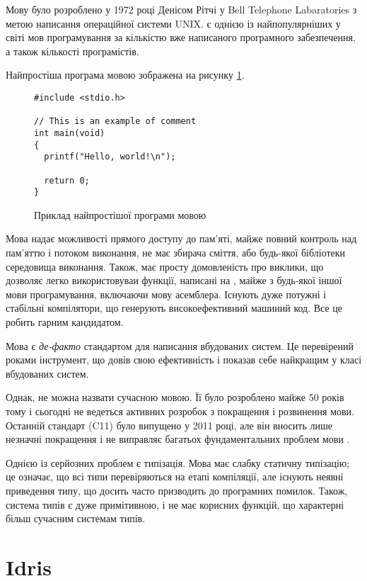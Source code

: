 \documentclass[main.tex]{subfiles}
\begin{document}
Мову \LangC{} було розроблено у 1972 році Денісом Рітчі у Bell Telephone Labaratories з метою написання операційної системи UNIX\cite{stewart-bill:history-of-c}. \LangC{} є однією із найпопулярніших у світі мов програмування за кількістю вже написаного програмного забезпечення, а також кількості програмістів.

Найпростіша програма мовою \LangC{} зображена на рисунку \ref{example:c}.

\begin{figure}[h]
  \centering
  \begin{verbatim}
#include <stdio.h>

// This is an example of comment
int main(void)
{
  printf("Hello, world!\n");

  return 0;
}
  \end{verbatim}
  \caption{Приклад найпростішої програми мовою \LangC{}}
  \label{example:c}
\end{figure}

Мова \LangC{} надає можливості прямого доступу до пам'яті, майже повний контроль над пам'яттю і потоком виконання, не має збирача сміття, або будь-якої бібліотеки середовища виконання. Також, \LangC{} має просту домовленість про виклики, що дозволяє легко використовуваи функції, написані на \LangC{}, майже з будь-якої іншої мови програмування, включаючи мову асемблера. Існують дуже потужні і стабільні компілятори, що генерують високоефективний машиний код. Все це робить \LangC{} гарним кандидатом.

Мова \LangC{} є \emph{де-факто} стандартом для написання вбудованих систем. Це перевірений роками інструмент, що довів свою ефективність і показав себе найкращим у класі вбудованих систем.

Однак, \LangC{} не можна назвати сучасною мовою. Її було розроблено майже 50 років тому і сьогодні не ведеться активних розробок з покращення і розвинення мови. Останній стандарт (C11) було випущено у 2011 році, але він вносить лише незначні покращення і не виправляє багатьох фундаментальних проблем мови \LangC{}.

Однією із серйозних проблем \LangC{} є типізація. Мова \LangC{} має слабку статичну типізацію; це означає, що всі типи перевіряються на етапі компіляції, але існують неявні приведення типу, що досить часто призводить до програмних помилок. Також, система типів є дуже примітивною, і не має корисних функцій, що характерні більш сучасним системам типів.

\section{Idris}\label{sec:idris}
\end{document}

